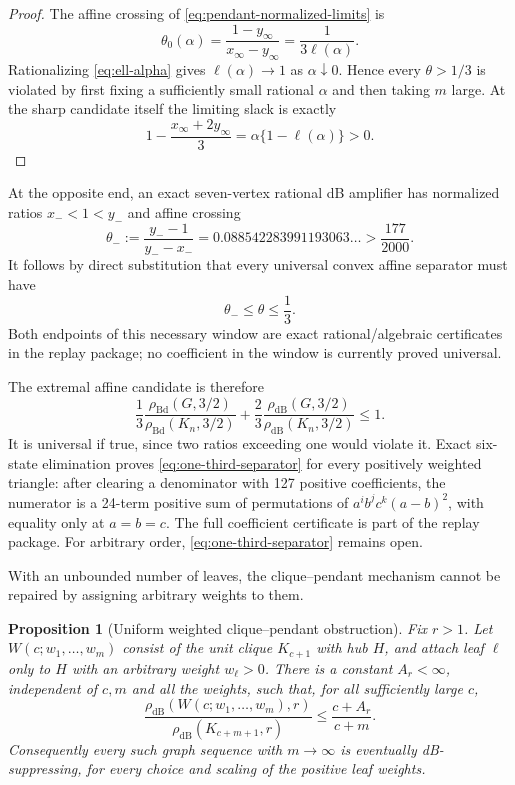 \documentclass[11pt]{article}
\newtheorem{proposition}[theorem]{Proposition}
\theoremstyle{definition}
\theoremstyle{remark}
\newcommand{\Bd}{\mathrm{Bd}}
\newcommand{\dB}{\mathrm{dB}}
\begin{document}
\begin{proof}
The affine crossing of \eqref{eq:pendant-normalized-limits} is
\[
 \theta_0(\alpha)
 =\frac{1-y_\infty}{x_\infty-y_\infty}
 =\frac{1}{3\ell(\alpha)}.
\]
Rationalizing \eqref{eq:ell-alpha} gives
$\ell(\alpha)\to1$ as $\alpha\downarrow0$.  Hence every
$\theta>1/3$ is violated by first fixing a sufficiently small rational
$\alpha$ and then taking $m$ large.  At the sharp candidate itself the
limiting slack is exactly
\[
 1-\frac{x_\infty+2y_\infty}{3}
 =\alpha\{1-\ell(\alpha)\}>0.
\]
\end{proof}

At the opposite end, an exact seven-vertex rational dB amplifier has
normalized ratios $x_-<1<y_-$ and affine crossing
\[
 \theta_-:=\frac{y_--1}{y_--x_-}
 =0.088542283991193063\ldots>\frac{177}{2000}.
\]
It follows by direct substitution that every universal convex affine
separator must have
\[
 \theta_-\leq\theta\leq\frac13.
\]
Both endpoints of this necessary window are exact rational/algebraic
certificates in the replay package; no coefficient in the window is
currently proved universal.

The extremal affine candidate is therefore
\begin{equation}
 \frac13\frac{\rho_{\Bd}(G,3/2)}{\rho_{\Bd}(K_n,3/2)}
 +\frac23\frac{\rho_{\dB}(G,3/2)}{\rho_{\dB}(K_n,3/2)}\leq1.
 \label{eq:one-third-separator}
\end{equation}
It is universal if true, since two ratios exceeding one would violate it.
Exact six-state elimination proves \eqref{eq:one-third-separator} for every
positively weighted triangle: after clearing a denominator with 127 positive
coefficients, the numerator is a 24-term positive sum of permutations of
$a^ib^jc^k(a-b)^2$, with equality only at $a=b=c$.  The full coefficient
certificate is part of the replay package.  For arbitrary order,
\eqref{eq:one-third-separator} remains open.

With an unbounded number of leaves, the clique--pendant mechanism cannot be
repaired by assigning arbitrary weights to them.

\begin{proposition}[Uniform weighted clique--pendant obstruction]
\label{prop:weighted-pendant}
Fix $r>1$.  Let $W(c;w_1,\ldots,w_m)$ consist of the unit clique
$K_{c+1}$ with hub $H$, and attach leaf $\ell$ only to $H$ with an arbitrary
weight $w_\ell>0$.  There is a constant $A_r<\infty$, independent of
$c,m$ and all the weights, such that, for all sufficiently large $c$,
\begin{equation}
 \frac{\rho_{\dB}(W(c;w_1,\ldots,w_m),r)}
      {\rho_{\dB}(K_{c+m+1},r)}
 \leq\frac{c+A_r}{c+m}.
 \label{eq:weighted-pendant-bound}
\end{equation}
Consequently every such graph sequence with $m\to\infty$ is eventually
dB-suppressing, for every choice and scaling of the positive leaf weights.
\end{proposition}
\end{document}
